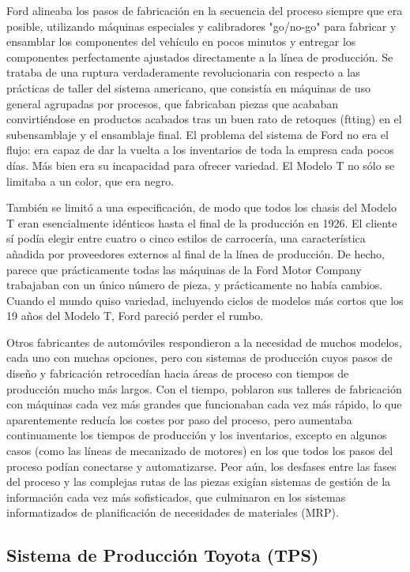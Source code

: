 Ford alineaba los pasos de fabricación en la secuencia del proceso siempre que era posible, utilizando máquinas especiales y calibradores "go/no-go" para fabricar y ensamblar los componentes del vehículo en pocos minutos y entregar los componentes perfectamente ajustados directamente a la línea de producción.
Se trataba de una ruptura verdaderamente revolucionaria con respecto a las prácticas de taller del sistema americano, que consistía en máquinas de uso general agrupadas por procesos, que fabricaban piezas que acababan convirtiéndose en productos acabados tras un buen rato de retoques (ftting) en el subensamblaje y el ensamblaje final.
El problema del sistema de Ford no era el flujo: era capaz de dar la vuelta a los inventarios de toda la empresa cada pocos días.
Más bien era su incapacidad para ofrecer variedad.
El Modelo T no sólo se limitaba a un color, que era negro.

También se limitó a una especificación, de modo que todos los chasis del Modelo T eran esencialmente idénticos hasta el final de la producción en 1926.
El cliente sí podía elegir entre cuatro o cinco estilos de carrocería, una característica añadida por proveedores externos al final de la línea de producción.
De hecho, parece que prácticamente todas las máquinas de la Ford Motor Company trabajaban con un único número de pieza, y prácticamente no había cambios.
Cuando el mundo quiso variedad, incluyendo ciclos de modelos más cortos que los 19 años del Modelo T, Ford pareció perder el rumbo.

Otros fabricantes de automóviles respondieron a la necesidad de muchos modelos, cada uno con muchas opciones, pero con sistemas de producción cuyos pasos de diseño y fabricación retrocedían hacia áreas de proceso con tiempos de producción mucho más largos.
Con el tiempo, poblaron sus talleres de fabricación con máquinas cada vez más grandes que funcionaban cada vez más rápido, lo que aparentemente reducía los costes por paso del proceso, pero aumentaba continuamente los tiempos de producción y los inventarios, excepto en algunos casos (como las líneas de mecanizado de motores) en los que todos los pasos del proceso podían conectarse y automatizarse.
Peor aún, los desfases entre las fases del proceso y las complejas rutas de las piezas exigían sistemas de gestión de la información cada vez más sofisticados, que culminaron en los sistemas informatizados de planificación de necesidades de materiales (MRP).

\subsection{Sistema de Producción Toyota (TPS)}

